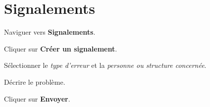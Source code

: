 \section{Signalements}

\begin{steps}
  \item Naviguer vers \textbf{Signalements}.
  \item Cliquer sur \textbf{Cr\'eer un signalement}.
  \item S\'electionner le \textit{type d'erreur} et la \textit{personne ou structure concern\'ee}.
  \item D\'ecrire le probl\`eme.
  \item Cliquer sur \textbf{Envoyer}.
\end{steps}

